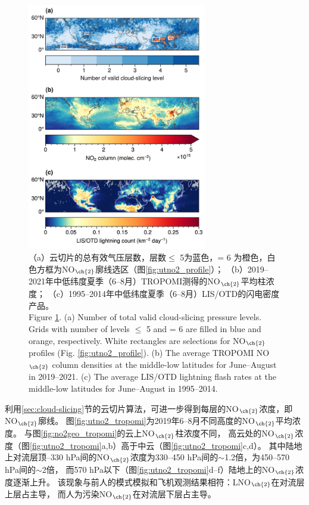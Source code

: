 \begin{figure}[H]
    \centering
    \includegraphics[width=0.7\textwidth]{./figures/no2_ltngcount.png}
    \caption{
    （a）云切片的总有效气压层数，层数$\leq$ 5为蓝色，= 6 为橙色，白色方框为NO$_{\ch{2}}$廓线选区（图\ref{fig:utno2_profile}）；
    （b）2019--2021年中低纬度夏季（6--8月）TROPOMI测得的NO$_{\ch{2}}$平均柱浓度；
    （c）1995--2014年中低纬度夏季（6--8月）LIS/OTD的闪电密度产品。 \\
    Figure \ref{fig:no2_ltngcount}. (a) Number of total valid cloud-slicing pressure levels.
    Grids with number of levels $\leq$ 5 and = 6 are filled in blue and orange, respectively.
    White rectangles are selections for NO$_{\ch{2}}$ profiles (Fig. \ref{fig:utno2_profile}).
    (b) The average TROPOMI NO$_{\ch{2}}$ column densities at the middle-low latitudes for June--August in 2019--2021.
    (c) The average LIS/OTD lightning flash rates at the middle-low latitudes for June--August in 1995--2014.
    }
    \label{fig:no2_ltngcount}
\end{figure}


利用\ref{sec:cloud-slicing}节的云切片算法，可进一步得到每层的NO$_{\ch{2}}$浓度，即NO$_{\ch{2}}$廓线。
图\ref{fig:utno2_tropomi}为2019年6--8月不同高度的NO$_{\ch{2}}$平均浓度。
与图\ref{fig:no2geo_tropomi}的云上NO$_{\ch{2}}$柱浓度不同，
高云处的NO$_{\ch{2}}$浓度（图\ref{fig:utno2_tropomi}a,b）高于中云（图\ref{fig:utno2_tropomi}c,d）。
其中陆地上对流层顶--330 hPa间的NO$_{\ch{2}}$浓度为330--450 hPa间的$\sim$1.2倍，为450--570 hPa间的$\sim$2倍，
而570 hPa以下（图\ref{fig:utno2_tropomi}d--f）陆地上的NO$_{\ch{2}}$浓度逐渐上升。
该现象与前人的模式模拟和飞机观测结果相符：LNO$_{\ch{2}}$在对流层上层占主导，
而人为污染NO$_{\ch{2}}$在对流层下层占主导\citep{Pickering.1996,Ott.2010,Laughner.2017}。


